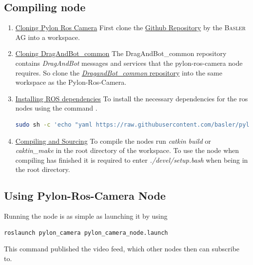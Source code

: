 \subsection{Compiling node}

\begin{enumerate}
    \item \underline{Cloning Pylon Ros Camera} \newline
    First clone the \href{https://github.com/basler/pylon-ros-camera}{Github Repository} by the \cite{pylonroscamera} \textsc{Basler AG} into a workspace.
    
    \item \underline{Cloning DragAndBot\_common} \newline
    The DragAndBot\_common repository contains \textit{DragAndBot} messages and services that the pylon-\gls{ros}-camera node requires.
    So clone the \href{https://github.com/dragandbot/dragandbot_common}{\textit{DragandBot\_common} repository} \cite{dragandbotcommon} into the same workspace as the Pylon-Ros-Camera.
    
    \item \underline{Installing ROS dependencies} \newline
    To install the necessary dependencies for the \gls{ros} nodes using the command \cite{code:installdeppylonroscamera}.
    \begin{lstlisting}[language=bash, caption={Installing dependencies for Pylon-Ros-Camera}, label={code:installdeppylonroscamera}]
sudo sh -c 'echo "yaml https://raw.githubusercontent.com/basler/pylon-ros-camera/master/pylon_camera/rosdep/pylon_sdk.yaml" > /etc/ros/rosdep/sources.list.d/30-pylon_camera.list' && rosdep update && sudo rosdep install --from-paths . --ignore-src --rosdistro=$ROS_DISTRO -y
    \end{lstlisting}
    
    \item \underline{Compiling and Sourcing} \newline
    To compile the nodes run \textit{catkin build} or \textit{caktin\_make} in the root directory of the workspace.\newline
    To use the node when compiling has finished it is required to enter \textit{./devel/setup.bash} when being in the root directory.
\end{enumerate}

\subsection{Using Pylon-Ros-Camera Node}
Running the node is as simple as launching it by using \newline
\begin{lstlisting}[language=bash]
roslaunch pylon_camera pylon_camera_node.launch
\end{lstlisting}
This command published the video feed, which other nodes then can subscribe to.